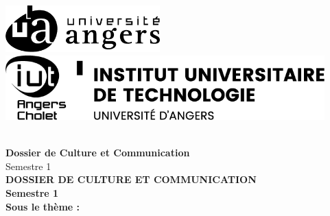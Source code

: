 \documentclass[a4paper,12pt]{report}
\begin{document}
	\begin{titlepage}
		\begin{center}
			\begin{minipage}{2.5cm}
				\begin{center}
					\includegraphics[height=1.8cm]{./logo/ua_h_noir_ecran.png}
					\includegraphics[height=2.5cm]{./logo/ua_iut_h_noir_ecran.png}

				\end{center}
			\end{minipage}\hfill

			\begin{minipage}{2.5cm}
				\begin{center}
				\end{center}
			
			\end{minipage}

			
			



			\textsc{\Large }\\[1.5cm]
			{\large \bfseries Dossier de Culture et Communication}\\[0.5cm]
			{\large Semestre 1}\\[1cm]

			{\huge \bfseries \uppercase{Dossier de Culture et Communication} \\[0.5cm] }
			{\large \bfseries Semestre 1}
			\textsc{\Large }\\[2.5cm]
			{\large \bfseries   Sous le thème :}\\[0.5cm]


\end{center}
\end{titlepage}
\end{document}
